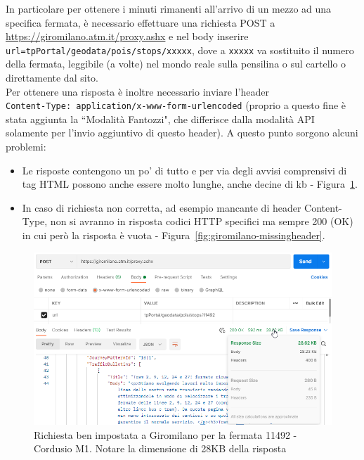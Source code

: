 \documentclass[12pt,a4paper]{report}
\begin{document}
In particolare per ottenere i minuti rimanenti all'arrivo di un mezzo ad una specifica fermata, è necessario effettuare una richiesta
POST a\\ \url{https://giromilano.atm.it/proxy.ashx} e nel body inserire\\ \texttt{url=tpPortal/geodata/pois/stops/xxxxx}, dove a
\texttt{xxxxx} va sostituito il numero della fermata, leggibile (a volte) nel mondo reale sulla pensilina o sul cartello o direttamente
dal sito.\\
Per ottenere una risposta è inoltre necessario inviare l'header\\ \texttt{Content-Type: application/x-www-form-urlencoded}
(proprio a questo fine è stata aggiunta la ``Modalità Fantozzi", che differisce dalla modalità API solamente per l'invio aggiuntivo
di questo header).
A questo punto sorgono alcuni problemi:
\begin{itemize}
  \item Le risposte contengono un po' di tutto e per via degli avvisi comprensivi di tag HTML possono anche essere molto lunghe, anche
        decine di kb - Figura~\ref{fig:giromilano-correctreq}.
  \item In caso di richiesta non corretta, ad esempio mancante di header Content-Type, non si avranno in risposta codici HTTP specifici
        ma sempre 200 (OK) in cui però la risposta è vuota - Figura~\ref{fig:giromilano-missingheader}.
\end{itemize}

\begin{figure}[h]
  \centering
  \includegraphics[width=\textwidth]{giromilano-correctreq}
  \caption{Richiesta ben impostata a Giromilano per la fermata 11492 - Cordusio M1. Notare la dimensione di 28KB della risposta}
  \label{fig:giromilano-correctreq}
\end{figure}
\end{document}
